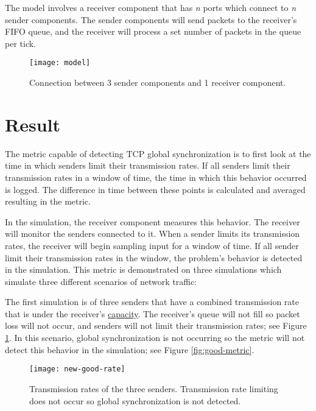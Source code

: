 \documentclass{article}
\newcommand{\plotsize}{0.25}
\begin{document}
The model involves a receiver component that has \textit{n} ports which connect to \textit{n} sender components. The sender components will send packets to the receiver's FIFO queue, and the receiver will process a set number of packets in the queue per tick. 

\begin{figure}[H]
	\centering
	\texttt{[image: model]}
	\caption{Connection between 3 sender components and 1 receiver component.}
\end{figure}

\section{Result} %

The metric capable of detecting TCP global synchronization is to first look at the time in which senders limit their transmission rates. If all senders limit their transmission rates in a window of time, the time in which this behavior occurred is logged. The difference in time between these points is calculated and averaged resulting in the metric.

						
In the simulation, the receiver component measures this behavior. The receiver will monitor the senders connected to it. When a sender limits its transmission rates, the receiver will begin sampling input for a window of time. If all sender limit their transmission rates in the window, the problem's behavior is detected in the simulation. This metric is demonstrated on three simulations which simulate three different scenarios of network traffic:
											
The first simulation is of three senders that have a combined transmission rate that is under the receiver's \href{https://www.solarwinds.com/resources/it-glossary/network-capacity}{capacity}. The receiver's queue will not fill so packet loss will not occur, and senders will not limit their transmission rates; see Figure \ref{fig:good-rate}. In this scenario, global synchronization is not occurring so the metric will not detect this behavior in the simulation; see Figure \ref{fig:good-metric}.
	
\begin{figure}[H]
	\centering
	\texttt{[image: new-good-rate]}
	\caption{Transmission rates of the three senders. Transmission rate limiting does not occur so global synchronization is not detected.}
	\label{fig:good-rate}
\end{figure}
\end{document}
